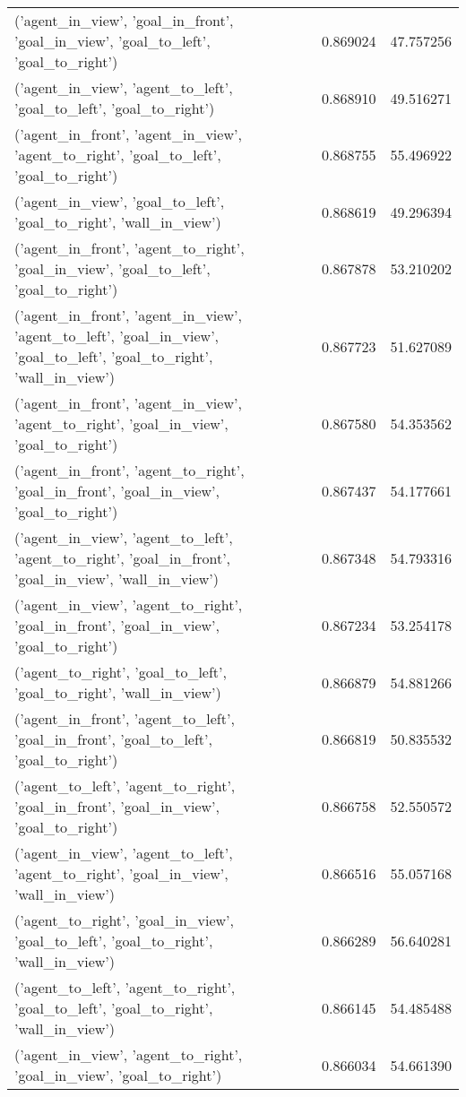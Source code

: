 \begin{tabular}{lrr}
('agent\_in\_view', 'goal\_in\_front', 'goal\_in\_view', 'goal\_to\_left', 'goal\_to\_right') & 0.869024 & 47.757256 \\
('agent\_in\_view', 'agent\_to\_left', 'goal\_to\_left', 'goal\_to\_right') & 0.868910 & 49.516271 \\
('agent\_in\_front', 'agent\_in\_view', 'agent\_to\_right', 'goal\_to\_left', 'goal\_to\_right') & 0.868755 & 55.496922 \\
('agent\_in\_view', 'goal\_to\_left', 'goal\_to\_right', 'wall\_in\_view') & 0.868619 & 49.296394 \\
('agent\_in\_front', 'agent\_to\_right', 'goal\_in\_view', 'goal\_to\_left', 'goal\_to\_right') & 0.867878 & 53.210202 \\
('agent\_in\_front', 'agent\_in\_view', 'agent\_to\_left', 'goal\_in\_view', 'goal\_to\_left', 'goal\_to\_right', 'wall\_in\_view') & 0.867723 & 51.627089 \\
('agent\_in\_front', 'agent\_in\_view', 'agent\_to\_right', 'goal\_in\_view', 'goal\_to\_right') & 0.867580 & 54.353562 \\
('agent\_in\_front', 'agent\_to\_right', 'goal\_in\_front', 'goal\_in\_view', 'goal\_to\_right') & 0.867437 & 54.177661 \\
('agent\_in\_view', 'agent\_to\_left', 'agent\_to\_right', 'goal\_in\_front', 'goal\_in\_view', 'wall\_in\_view') & 0.867348 & 54.793316 \\
('agent\_in\_view', 'agent\_to\_right', 'goal\_in\_front', 'goal\_in\_view', 'goal\_to\_right') & 0.867234 & 53.254178 \\
('agent\_to\_right', 'goal\_to\_left', 'goal\_to\_right', 'wall\_in\_view') & 0.866879 & 54.881266 \\
('agent\_in\_front', 'agent\_to\_left', 'goal\_in\_front', 'goal\_to\_left', 'goal\_to\_right') & 0.866819 & 50.835532 \\
('agent\_to\_left', 'agent\_to\_right', 'goal\_in\_front', 'goal\_in\_view', 'goal\_to\_right') & 0.866758 & 52.550572 \\
('agent\_in\_view', 'agent\_to\_left', 'agent\_to\_right', 'goal\_in\_view', 'wall\_in\_view') & 0.866516 & 55.057168 \\
('agent\_to\_right', 'goal\_in\_view', 'goal\_to\_left', 'goal\_to\_right', 'wall\_in\_view') & 0.866289 & 56.640281 \\
('agent\_to\_left', 'agent\_to\_right', 'goal\_to\_left', 'goal\_to\_right', 'wall\_in\_view') & 0.866145 & 54.485488 \\
('agent\_in\_view', 'agent\_to\_right', 'goal\_in\_view', 'goal\_to\_right') & 0.866034 & 54.661390 \\

\end{tabular}
